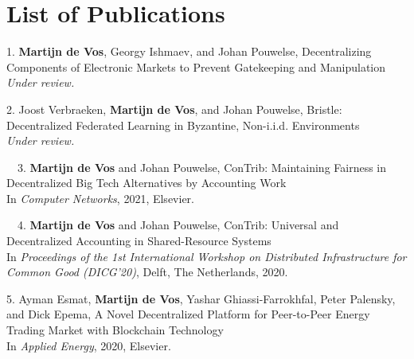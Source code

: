 \chapter*{List of Publications}
\label{publications}

\begin{etaremune}{%
		
\item[1.] \textbf{Martijn de Vos}, Georgy Ishmaev, and Johan Pouwelse, Decentralizing Components of Electronic Markets to Prevent Gatekeeping and Manipulation\\
\emph{Under review.}
		
\item[2.] Joost Verbraeken, \textbf{Martijn de Vos}, and Johan Pouwelse, Bristle: Decentralized Federated Learning in Byzantine, Non-i.i.d. Environments\\
\emph{Under review.}


\item[\faFileTextO~~3.] \textbf{Martijn de Vos} and Johan Pouwelse, ConTrib: Maintaining Fairness in Decentralized Big Tech Alternatives by Accounting Work\\
In \emph{Computer Networks}, 2021, Elsevier.

\item[\faFileTextO~~4.] \textbf{Martijn de Vos} and Johan Pouwelse, ConTrib: Universal and Decentralized Accounting in Shared-Resource Systems\\
In \emph{Proceedings of the 1st International Workshop on Distributed Infrastructure for Common Good (DICG'20)}, Delft, The Netherlands, 2020.

\item[5.] Ayman Esmat, \textbf{Martijn de Vos}, Yashar Ghiassi-Farrokhfal, Peter Palensky, and Dick Epema, A Novel Decentralized Platform for Peer-to-Peer Energy Trading Market with Blockchain Technology\\
In \emph{Applied Energy}, 2020, Elsevier.

}
\end{etaremune}
